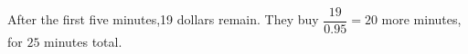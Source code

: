 After the first five minutes,19 dollars remain. They buy $\dfrac{19}{0.95}=20 $ more minutes, for $\boxed{25}$ minutes total.
